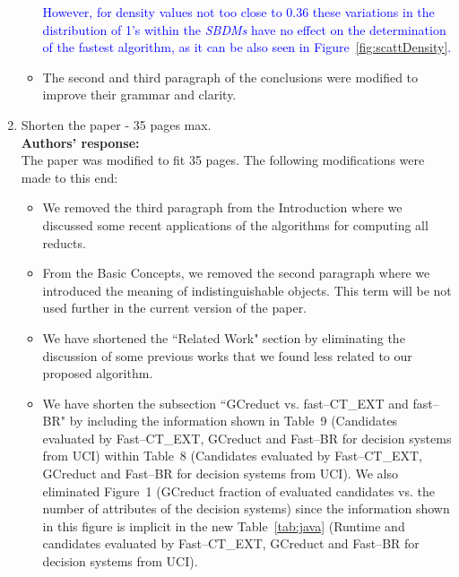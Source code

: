 \documentclass{letter}
\begin{document}
\begin{letter}{}
\begin{enumerate}
\begin{itemize}
		\textcolor{blue}{However, for density values not too close to 0.36 these variations in the distribution of 1's within the \textit{SBDMs} have no effect on the determination of the fastest algorithm, as it can be also seen in Figure~\ref{fig:scattDensity}.}
		
		\item The second and third paragraph of the conclusions were modified to improve their grammar and clarity.
		
	\end{itemize}
		 
	\item Shorten the paper - 35 pages max.\\
	\textbf{Authors’ response:} \\
	The paper was modified to fit 35 pages. The following modifications were made to this end:
	\begin{itemize}
		\item We removed the third paragraph from the Introduction where we discussed some recent applications of the algorithms for computing all reducts.
		
		\item From the  Basic Concepts, we removed the second paragraph where we introduced the meaning of indistinguishable objects. This term will be not used further in the current version of the paper.

		
		\item We have shortened the ``Related Work" section by eliminating the discussion of some previous works that we found less related to our proposed algorithm.
		
		
		\item We have shorten the subsection ``GCreduct vs. fast--CT\_EXT and fast--BR" by including the information shown in Table~9 (Candidates evaluated by Fast--CT\_EXT, GCreduct and Fast--BR for decision systems from UCI) within Table~8 (Candidates evaluated by Fast--CT\_EXT, GCreduct and Fast--BR for decision systems from UCI). We also eliminated Figure~1 (GCreduct fraction of evaluated candidates vs. the number of attributes of the decision systems) since the information shown in this figure is implicit in the new Table~\ref{tab:java} (Runtime and candidates evaluated by Fast--CT\_EXT, GCreduct and Fast--BR for decision systems from UCI).
		

\end{itemize}
\end{enumerate}
\end{letter}
\end{document}
